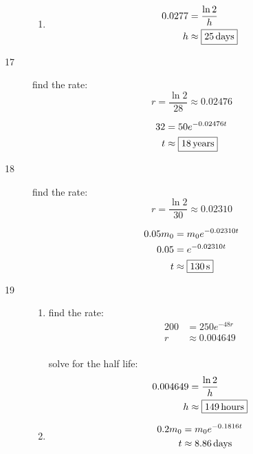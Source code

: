 \documentclass{exam}
\begin{document}
\begin{description}
\begin{enumerate}[a]
          \item
            \begin{align*}
              0.0277 & = \frac{\ln 2}{h} \\
              h      & \approx \boxed{\unit[25]{days}} \\
            \end{align*}
        \end{enumerate}

      \item[17]
        find the rate: 
        \[
          r = \frac{\ln 2}{28} \approx 0.02476
        \]

        \begin{align*}
          32 & = 50 e^{-0.02476 t} \\
          t  & \approx \boxed{\unit[18]{years}} \\
        \end{align*}

      \item[18]
        find the rate: 
        \[
          r = \frac{\ln 2}{30} \approx 0.02310
        \]

        \begin{align*}
          0.05m_0 & = m_0 e^{-0.02310 t} \\
          0.05    & =  e^{-0.02310 t} \\
          t       & \approx \boxed{\unit[130]{s}} \\
        \end{align*}

      \item[19]
        \begin{enumerate}[a]
          \item 
            find the rate:
            \begin{align*}
              200 & = 250 e^{-48r} \\
              r   & \approx 0.004649 \\
            \end{align*}

            solve for the half life:
            \begin{align*}
              0.004649 & = \frac{\ln 2}{h} \\
              h        & \approx \boxed{\unit[149]{hours}} \\
            \end{align*}

          \item
            \begin{align*}
              0.2 m_0 & = m_0 e^{-0.1816t} \\
              t       & \approx \unit[8.86]{days} \\
            \end{align*}


\end{enumerate}
\end{description}
\end{document}
